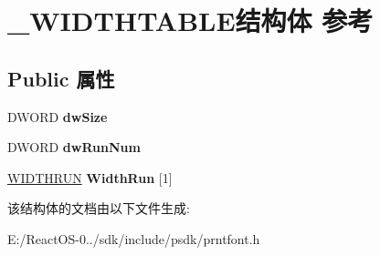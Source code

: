 \hypertarget{struct___w_i_d_t_h_t_a_b_l_e}{}\section{\+\_\+\+W\+I\+D\+T\+H\+T\+A\+B\+L\+E结构体 参考}
\label{struct___w_i_d_t_h_t_a_b_l_e}
\subsection*{Public 属性}
\begin{DoxyCompactItemize}
\item 
\mbox{\label{struct___w_i_d_t_h_t_a_b_l_e_ad64bb4ac0aef5c638963a5fc62a58885}} 
D\+W\+O\+RD {\bfseries dw\+Size}
\item 
\mbox{\label{struct___w_i_d_t_h_t_a_b_l_e_a0d62673787a72e26b977f9026b5b7be6}} 
D\+W\+O\+RD {\bfseries dw\+Run\+Num}
\item 
\mbox{\label{struct___w_i_d_t_h_t_a_b_l_e_a2ae3f4606243f2b3de0e526c4f52c298}} 
\hyperlink{struct___w_i_d_t_h_r_u_n}{W\+I\+D\+T\+H\+R\+UN} {\bfseries Width\+Run} \mbox{[}1\mbox{]}
\end{DoxyCompactItemize}


该结构体的文档由以下文件生成\+:\begin{DoxyCompactItemize}
\item 
E\+:/\+React\+O\+S-\/0../sdk/include/psdk/prntfont.\+h\end{DoxyCompactItemize}
